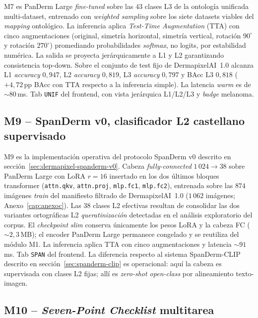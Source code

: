 M7 es PanDerm Large \emph{fine-tuned} sobre las $43$ clases L3 de
la ontología unificada multi-dataset, entrenado con
\emph{weighted sampling} sobre los siete datasets viables del
\emph{mapping} ontológico. La inferencia aplica \emph{Test-Time
Augmentation} (TTA) con cinco augmentaciones (original, simetría
horizontal, simetría vertical, rotación $90^\circ$ y rotación
$270^\circ$) promediando probabilidades \emph{softmax}, no
logits, por estabilidad numérica. La salida se proyecta
jerárquicamente a L1 y L2 garantizando consistencia top-down.
Sobre el conjunto de test fijo de DermapixelAI~1.0 alcanza
L1 \emph{accuracy} $0{,}947$, L2 \emph{accuracy} $0{,}819$,
L3 \emph{accuracy} $0{,}797$ y BAcc L3 $0{,}818$
($+4{,}72$\,pp BAcc con TTA respecto a la inferencia simple).
La latencia \emph{warm} es de $\sim 80$\,ms. Tab \texttt{UNIF}
del frontend, con vista jerárquica L1/L2/L3 y \emph{badge}
melanoma.

\subsection{M9 -- SpanDerm v0, clasificador L2 castellano
supervisado}
\label{sec:dermapixel-m9}

M9 es la implementación operativa del protocolo SpanDerm v0
descrito en secci\'on~\ref{sec:dermapixel-spanderm-v0}. Cabeza
\emph{fully-connected} $1\,024 \to 38$ sobre PanDerm Large con
LoRA $r = 16$ insertado en los dos últimos bloques transformer
(\texttt{attn.qkv}, \texttt{attn.proj}, \texttt{mlp.fc1},
\texttt{mlp.fc2}), entrenada sobre las $874$ imágenes \emph{train}
del manifiesto filtrado de DermapixelAI~1.0 ($1\,062$ imágenes;
Anexo~\ref{cap:anexoc}). Las $38$ clases L2
efectivas resultan de consolidar las dos variantes ortográficas
L2 \emph{queratinización} detectadas en el análisis exploratorio
del corpus. El \emph{checkpoint} \emph{slim} conserva únicamente
los pesos LoRA y la cabeza FC ($\sim 2{,}3$\,MB); el encoder
PanDerm Large permanece congelado y se reutiliza del módulo M1.
La inferencia aplica TTA con cinco augmentaciones y latencia
$\sim 91$\,ms. Tab \texttt{SPAN} del frontend. La diferencia
respecto al sistema SpanDerm-CLIP descrito en
secci\'on~\ref{sec:spanderm-clip} es operacional: aquí la cabeza
es supervisada con clases L2 fijas; allí es \emph{zero-shot
open-class} por alineamiento texto-imagen.

\subsection{M10 -- \emph{Seven-Point Checklist} multitarea}
\label{sec:dermapixel-m10}

